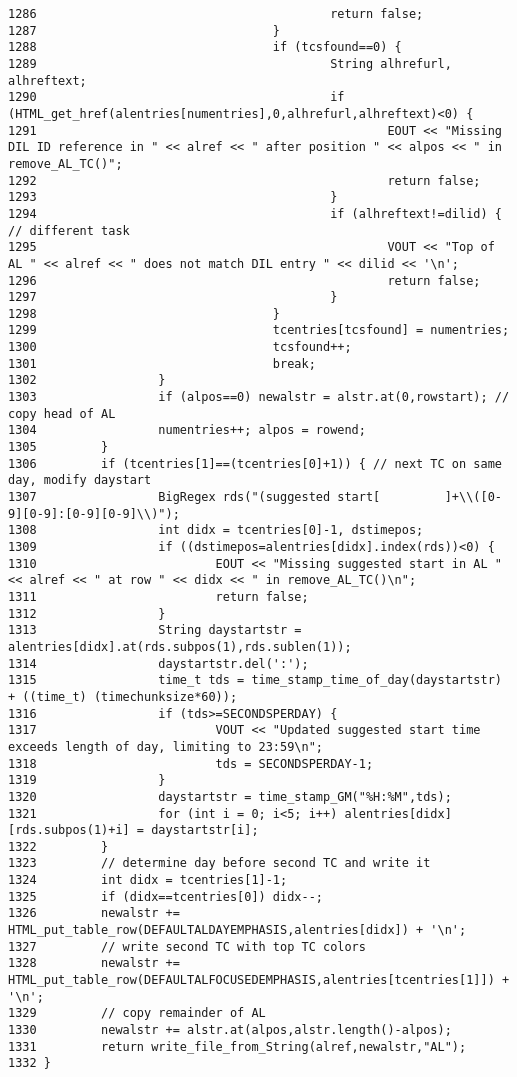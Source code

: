 \begin{verbatim}
1286                                         return false;
1287                                 }
1288                                 if (tcsfound==0) {
1289                                         String alhrefurl, alhreftext;
1290                                         if (HTML_get_href(alentries[numentries],0,alhrefurl,alhreftext)<0) {
1291                                                 EOUT << "Missing DIL ID reference in " << alref << " after position " << alpos << " in remove_AL_TC()";
1292                                                 return false;
1293                                         }
1294                                         if (alhreftext!=dilid) { // different task
1295                                                 VOUT << "Top of AL " << alref << " does not match DIL entry " << dilid << '\n';
1296                                                 return false;
1297                                         }
1298                                 }
1299                                 tcentries[tcsfound] = numentries;
1300                                 tcsfound++;
1301                                 break;
1302                 }
1303                 if (alpos==0) newalstr = alstr.at(0,rowstart); // copy head of AL
1304                 numentries++; alpos = rowend;
1305         }
1306         if (tcentries[1]==(tcentries[0]+1)) { // next TC on same day, modify daystart
1307                 BigRegex rds("(suggested start[         ]+\\([0-9][0-9]:[0-9][0-9]\\)");
1308                 int didx = tcentries[0]-1, dstimepos;
1309                 if ((dstimepos=alentries[didx].index(rds))<0) {
1310                         EOUT << "Missing suggested start in AL " << alref << " at row " << didx << " in remove_AL_TC()\n";
1311                         return false;
1312                 }
1313                 String daystartstr = alentries[didx].at(rds.subpos(1),rds.sublen(1));
1314                 daystartstr.del(':');
1315                 time_t tds = time_stamp_time_of_day(daystartstr) + ((time_t) (timechunksize*60));
1316                 if (tds>=SECONDSPERDAY) {
1317                         VOUT << "Updated suggested start time exceeds length of day, limiting to 23:59\n";
1318                         tds = SECONDSPERDAY-1;
1319                 }
1320                 daystartstr = time_stamp_GM("%H:%M",tds);
1321                 for (int i = 0; i<5; i++) alentries[didx][rds.subpos(1)+i] = daystartstr[i];
1322         }
1323         // determine day before second TC and write it
1324         int didx = tcentries[1]-1;
1325         if (didx==tcentries[0]) didx--;
1326         newalstr += HTML_put_table_row(DEFAULTALDAYEMPHASIS,alentries[didx]) + '\n';
1327         // write second TC with top TC colors
1328         newalstr += HTML_put_table_row(DEFAULTALFOCUSEDEMPHASIS,alentries[tcentries[1]]) + '\n';
1329         // copy remainder of AL
1330         newalstr += alstr.at(alpos,alstr.length()-alpos);
1331         return write_file_from_String(alref,newalstr,"AL");
1332 }
\end{verbatim}\normalsize 
{}
